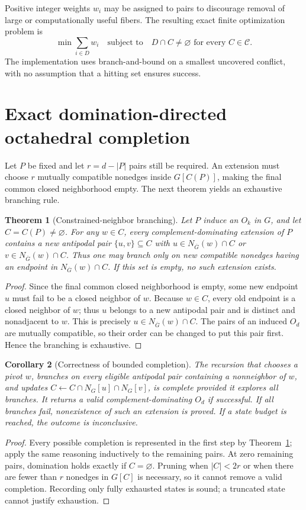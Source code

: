 \documentclass[11pt]{article}
\newtheorem{theorem}{Theorem}[section]
\newtheorem{corollary}[theorem]{Corollary}
\newcommand{\CC}[1]{C(#1)}
\begin{document}
Positive integer weights \(w_i\) may be assigned to pairs to discourage
removal of large or computationally useful fibers. The resulting exact
finite optimization problem is
\[
 \min \sum_{i\in D}w_i
 \quad\text{subject to}\quad D\cap C\ne\varnothing
 \text{ for every }C\in\mathcal C.
\]
The implementation uses branch-and-bound on a smallest uncovered
conflict, with no assumption that a hitting set ensures success.

\section{Exact domination-directed octahedral completion}
Let \(P\) be fixed and let \(r=d-|P|\) pairs still be required.
An extension must choose \(r\) mutually compatible nonedges inside
\(G[\CC P]\), making the final common closed neighborhood empty.
The next theorem yields an exhaustive branching rule.

\begin{theorem}[Constrained-neighbor branching]
\label{thm:pivot}
Let \(P\) induce an \(O_k\) in \(G\), and let \(C=\CC P\ne\varnothing\).
For any \(w\in C\), every complement-dominating extension of \(P\)
contains a new antipodal pair \(\{u,v\}\subseteq C\) with
\(u\in N_{\overline G}(w)\cap C\) or
\(v\in N_{\overline G}(w)\cap C\).
Thus one may branch only on new compatible nonedges having an endpoint
in \(N_{\overline G}(w)\cap C\). If this set is empty, no such
extension exists.
\end{theorem}
\begin{proof}
Since the final common closed neighborhood is empty, some
new endpoint \(u\) must fail to be a closed neighbor of \(w\).
Because \(w\in C\), every old endpoint is a closed neighbor of \(w\);
thus \(u\) belongs to a new antipodal pair and is distinct and
nonadjacent to \(w\). This is precisely
\(u\in N_{\overline G}(w)\cap C\). The pairs of an induced
\(O_d\) are mutually compatible, so their order can be changed to
put this pair first. Hence the branching is exhaustive.
\end{proof}

\begin{corollary}[Correctness of bounded completion]\label{cor:complete}
The recursion that chooses a pivot \(w\), branches on every eligible
antipodal pair containing a nonneighbor of \(w\), and updates
\(C\gets C\cap N_G[u]\cap N_G[v]\), is complete provided it
explores all branches. It returns a valid complement-dominating
\(O_d\) if successful. If all branches fail, nonexistence of such
an extension is proved. If a state budget is reached, the outcome
is inconclusive.
\end{corollary}
\begin{proof}
Every possible completion is represented in the first step by
Theorem~\ref{thm:pivot}; apply the same reasoning inductively to
the remaining pairs. At zero remaining pairs, domination holds
exactly if \(C=\varnothing\). Pruning when \(|C|<2r\) or when
there are fewer than \(r\) nonedges in \(G[C]\) is necessary,
so it cannot remove a valid completion. Recording only fully
exhausted states is sound; a truncated state cannot justify
exhaustion.
\end{proof}
\end{document}
